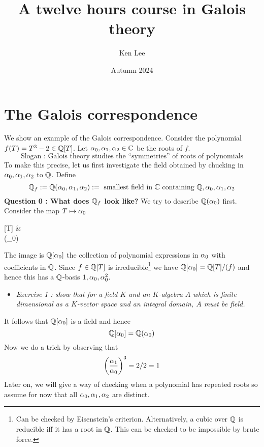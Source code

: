 \documentclass{article}
\begin{document}
\title{A twelve hours course in Galois theory}

\author{Ken Lee}
\date{Autumn 2024}
\maketitle

\tableofcontents

\section{The Galois correspondence}

We show an example of the Galois correspondence.
Consider the polynomial $f(T) = T^3 - 2 \in \mathbb{Q}[T]$.
Let $\alpha_0 , \alpha_1 , \alpha_2 \in \mathbb{C}$ be the roots of $f$.
\[
  \text{Slogan : Galois theory studies the ``symmetries'' of 
  roots of polynomials}
\]
To make this precise, let us first investigate the field obtained
by chucking in $\alpha_0 , \alpha_1 , \alpha_2$ to $\mathbb{Q}$.
Define \[
  \mathbb{Q}_f := \mathbb{Q}(\alpha_0 , \alpha_1 , \alpha_2) := 
  \text{ smallest field in $\mathbb{C}$ containing $\mathbb{Q} , \alpha_0 , \alpha_1 ,\alpha_2$}
\]
\textbf{Question 0 : What does $\mathbb{Q}_f$ look like?}
We try to describe $\mathbb{Q}(\alpha_0)$ first.
Consider the map $T \mapsto \alpha_0$ 
\begin{cd}
	{} & {} \\
	{(\alpha_0)}
	\arrow["{T \mapsto \al_0}", from=1-1, to=1-2]
	\arrow[dashed, from=1-1, to=2-1]
	\arrow["\subseteq"', from=2-1, to=1-2]
\end{cd}
The image is $\mathbb{Q}[\alpha_0]$ the collection of polynomial expressions
in $\alpha_0$ with coefficients in $\mathbb{Q}$.
Since $f \in \mathbb{Q}[T]$ is irreducible\footnote{
  Can be checked by Eisenstein's criterion.
  Alternatively, a cubic over $\mathbb{Q}$ is reducible iff
  it has a root in $\mathbb{Q}$.
  This can be checked to be impossible by brute force.
}
we have $\mathbb{Q}[\alpha_0] = \mathbb{Q}[T] / (f)$
and hence this has a $\mathbb{Q}$-basis $1 , \alpha_0 , \alpha_0^2$.
\begin{itemize}
  \item \textit{
    Exercise 1 :  show that for a field $K$ and 
    an $K$-algebra $A$ which is finite dimensional 
    as a $K$-vector space and an integral domain,
    $A$ must be field.
  }
\end{itemize}
It follows that $\mathbb{Q}[\alpha_0]$ is a field and hence
\[
  \mathbb{Q}[\alpha_0] = \mathbb{Q}(\alpha_0)
\]
Now we do a trick by observing that \[
  \left(\frac{\alpha_1}{\alpha_0}\right)^3 = 2 / 2 = 1
\]
Later on, we will give a way of checking when a polynomial has repeated roots
so assume for now that all $\alpha_0 , \alpha_1 , \alpha_2$ are distinct.
\end{document}
